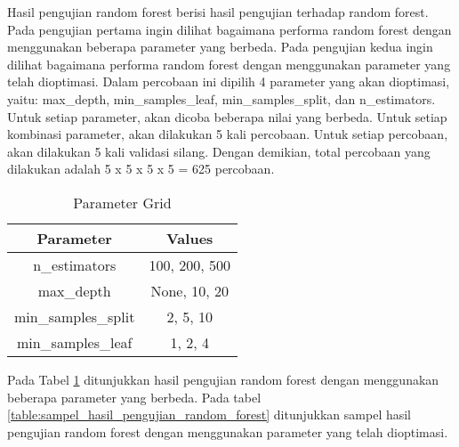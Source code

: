 Hasil pengujian random forest berisi hasil pengujian terhadap random forest. Pada pengujian pertama ingin dilihat bagaimana performa random forest dengan menggunakan beberapa parameter yang berbeda. Pada pengujian kedua ingin dilihat bagaimana performa random forest dengan menggunakan parameter yang telah dioptimasi.
Dalam percobaan ini dipilih 4 parameter yang akan dioptimasi, yaitu: max\_depth, min\_samples\_leaf, min\_samples\_split, dan n\_estimators. Untuk setiap parameter, akan dicoba beberapa nilai yang berbeda. Untuk setiap kombinasi parameter, akan dilakukan 5 kali percobaan. Untuk setiap percobaan, akan dilakukan 5 kali validasi silang. Dengan demikian, total percobaan yang dilakukan adalah 5 x 5 x 5 x 5 = 625 percobaan.

\begin{table}[h]
    \caption{Parameter Grid}
    \centering
    \begin{tabular}{|c|c|}
    \hline
    \textbf{Parameter} & \textbf{Values} \\
    \hline
    n\_estimators & 100, 200, 500 \\
    \hline
    max\_depth & None, 10, 20 \\
    \hline
    min\_samples\_split & 2, 5, 10 \\
    \hline
    min\_samples\_leaf & 1, 2, 4 \\
    \hline
    \end{tabular}
    \label{table:param_grid}
    \end{table}

Pada Tabel \ref{table:param_grid} ditunjukkan hasil pengujian random forest dengan menggunakan beberapa parameter yang berbeda. Pada tabel \ref{table:sampel_hasil_pengujian_random_forest} ditunjukkan sampel hasil pengujian random forest dengan menggunakan parameter yang telah dioptimasi.

